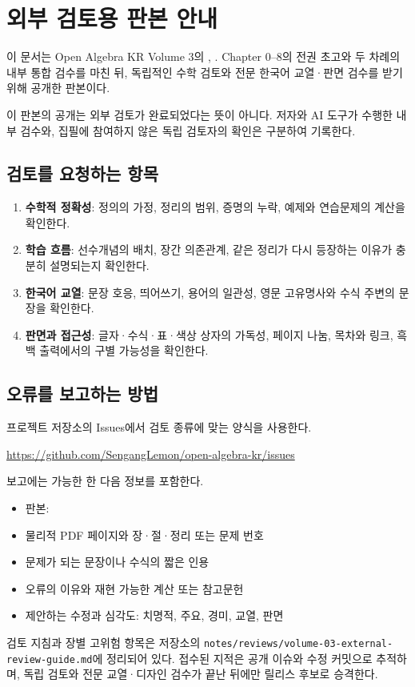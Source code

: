 \chapter*{외부 검토용 판본 안내}

이 문서는 Open Algebra KR Volume 3의 \BookVersion, . Chapter 0--8의 전권 초고와 두 차례의 내부 통합 검수를 마친 뒤, 독립적인 수학 검토와 전문 한국어 교열·판면 검수를 받기 위해 공개한 판본이다.

\begin{keyidea}
이 판본의 공개는 외부 검토가 완료되었다는 뜻이 아니다. 저자와 AI 도구가 수행한 내부 검수와, 집필에 참여하지 않은 독립 검토자의 확인은 구분하여 기록한다.
\end{keyidea}

\section*{검토를 요청하는 항목}

\begin{enumerate}[label=(\arabic*)]
  \item \textbf{수학적 정확성}: 정의의 가정, 정리의 범위, 증명의 누락, 예제와 연습문제의 계산을 확인한다.
  \item \textbf{학습 흐름}: 선수개념의 배치, 장간 의존관계, 같은 정리가 다시 등장하는 이유가 충분히 설명되는지 확인한다.
  \item \textbf{한국어 교열}: 문장 호응, 띄어쓰기, 용어의 일관성, 영문 고유명사와 수식 주변의 문장을 확인한다.
  \item \textbf{판면과 접근성}: 글자·수식·표·색상 상자의 가독성, 페이지 나눔, 목차와 링크, 흑백 출력에서의 구별 가능성을 확인한다.
\end{enumerate}

\section*{오류를 보고하는 방법}

프로젝트 저장소의 Issues에서 검토 종류에 맞는 양식을 사용한다.
\begin{center}
  \url{https://github.com/SengangLemon/open-algebra-kr/issues}
\end{center}
보고에는 가능한 한 다음 정보를 포함한다.

\begin{itemize}
  \item 판본: \BookVersion
  \item 물리적 PDF 페이지와 장·절·정리 또는 문제 번호
  \item 문제가 되는 문장이나 수식의 짧은 인용
  \item 오류의 이유와 재현 가능한 계산 또는 참고문헌
  \item 제안하는 수정과 심각도: 치명적, 주요, 경미, 교열, 판면
\end{itemize}

검토 지침과 장별 고위험 항목은 저장소의
\texttt{notes/reviews/volume-03-external-review-guide.md}에 정리되어 있다. 접수된 지적은 공개 이슈와 수정 커밋으로 추적하며, 독립 검토와 전문 교열·디자인 검수가 끝난 뒤에만 릴리스 후보로 승격한다.
